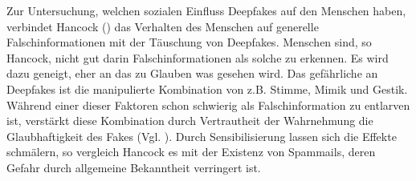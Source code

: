 \par
Zur Untersuchung, welchen sozialen Einfluss Deepfakes auf den Menschen haben, verbindet Hancock (\cite{Hancock2021}) das Verhalten des Menschen auf generelle Falschinformationen mit der Täuschung von Deepfakes.
Menschen sind, so Hancock, nicht gut darin Falschinformationen als solche zu erkennen.
Es wird dazu geneigt, eher an das zu Glauben was gesehen wird.
Das gefährliche an Deepfakes ist die manipulierte Kombination von z.B. Stimme, Mimik und Gestik.
Während einer dieser Faktoren schon schwierig als Falschinformation zu entlarven ist, verstärkt diese Kombination durch Vertrautheit der Wahrnehmung die Glaubhaftigkeit des Fakes (Vgl. \cite{Hancock2021}).
Durch Sensibilisierung lassen sich die Effekte schmälern, so vergleich Hancock es mit der Existenz von Spammails, deren Gefahr durch allgemeine Bekanntheit verringert ist.






